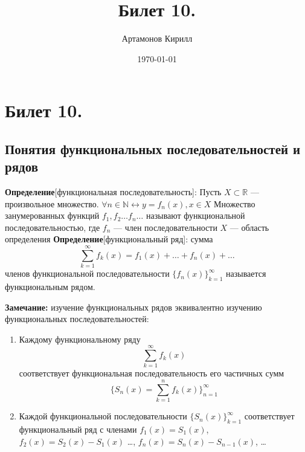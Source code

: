 \documentclass[a4paper,12pt]{article} %
\author{Артамонов Кирилл}
\title{Билет 10.}
\date{\today}
\begin{document}

\maketitle
\newpage

\section*{Билет 10.}
\subsection*{Понятия функциональных последовательностей и рядов }
\noindent \textbf{Определение}[функциональная последовательность]:\newline
Пусть $X \subset \mathds{R}$ --- произвольное множество. \newline
\hspace*{5mm}$\forall n \in \mathds{N} \leftrightarrow y = f_n(x), x \in X$ \newline 
Множество занумерованных функций $f_1, f_2 \dots f_n \dots $ называют функциональной последовательностью, где  \newline
\hspace*{50mm}$f_n$ --- член последовательности \newline
 \hspace*{50mm}   $X$ --- область определения 
\newline\newline
\noindent \textbf{Определение}[функциональный ряд]:\newline
сумма $${\sum_{k = 1}^{\infty}}  f_k(x) = f_1(x) + \dots + f_n(x) + \dots$$ \newline членов функциональной последовательности $\{f_n(x)\}_{k=1}^\infty$ называется функциональным рядом.
\newline

\noindent \textbf{Замечание:} изучение функциональных рядов эквивалентно изучению функциональных последовательностей:\newline
\begin{enumerate}
    \item Каждому функциональному ряду $${\sum_{k = 1}^{\infty}}f_k(x)$$ соответствует функциональная последовательность его частичных сумм $$\{S_n(x) = \sum_{k = 1}^{n}f_k(x)\}_{n=1}^\infty$$ 
   \item Каждой функциональной последовательности $\{S_n(x)\}_{k=1}^\infty$ соответствует функциональный ряд с членами $f_1(x) = S_1(x)$, $f_2(x) = S_2(x) - S_1(x)$ \dots, $f_n(x) = S_n(x) - S_{n-1}(x)$, \dots 
   
\end{enumerate}
\end{document}
